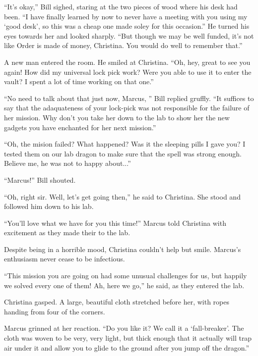 \documentclass[showtrims,b6paper,draft,10pt]{memoir}
\begin{document}
``It's okay,'' Bill sighed, staring at the two pieces of wood where his desk had been.  ``I have finally learned by now to never have a meeting with you using my `good desk', so this was a cheap one made soley for this occasion.''  He turned his eyes towards her and looked sharply.  ``But though we may be well funded, it's not like Order is made of money, Christina.  You would do well to remember that.''

A new man entered the room.  He smiled at Christina.  ``Oh, hey, great to see you again!  How did my universal lock pick work?  Were you able to use it to enter the vault?  I spent a lot of time working on that one.''

``No need to talk about that just now, Marcus, '' Bill replied gruffly.  ``It suffices to say that the adaquateness of your lock-pick was not responsible for the failure of her mission.  Why don't you take her down to the lab to show her the new gadgets you have enchanted for her next mission.''

``Oh, the mision failed?  What happened?  Was it the sleeping pills I gave you?  I tested them on our lab dragon to make sure that the spell was strong enough.  Believe me, he was not to happy about...''

``Marcus!''  Bill shouted.

``Oh, right sir.  Well, let's get going then,'' he said to Christina.  She stood and followed him down to his lab.

\timeskip

``You'll love what we have for you this time!'' Marcus told Christina with excitement as they made their to the lab.

Despite being in a horrible mood, Christina couldn't help but smile.  Marcus's enthusiasm never cease to be infectious.

``This mission you are going on had some unusual challenges for us, but happily we solved every one of them!  Ah, here we go,'' he said, as they entered the lab.

Christina gasped.  A large, beautiful cloth stretched before her, with ropes handing from four of the corners.

Marcus grinned at her reaction.  ``Do you like it?  We call it a `fall-breaker'.  The cloth was woven to be very, very light, but thick enough that it actually will trap air under it and allow you to glide to the ground after you jump off the dragon.''
\end{document}
